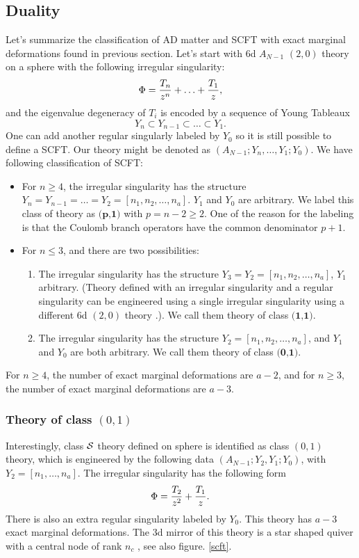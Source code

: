 \documentclass[a4paper,11pt]{article}
\begin{document}
\subsection{Duality}
Let's summarize the classification of AD matter and SCFT with exact marginal deformations found in previous section.  Let's start with 6d $A_{N-1}$ $(2,0)$ theory on a sphere with the following irregular singularity:
\begin{equation}
\Phi={T_n\over z^n}+\ldots+{T_1\over z},
\end{equation}
and the eigenvalue degeneracy of $T_i$ is encoded by a sequence of Young Tableaux
\begin{equation}
Y_{n}\subset Y_{n-1}\subset \ldots \subset Y_1.
\end{equation}
One can add another regular singularly labeled by  $Y_0$ so it is still possible to define a SCFT.  Our theory might be denoted as $(A_{N-1}; Y_{n},\ldots, Y_{1}; Y_0)$. 
We have following classification of SCFT:
\begin{itemize}
\item  For $n\geq 4$, the irregular singularity has the structure $Y_n=Y_{n-1}=\ldots=Y_2=[n_1, n_2,\ldots, n_a]$. $Y_1$ and $Y_0$ are arbitrary. We label this class of theory as $\textbf{(p,1)}$ with $p=n-2\geq 2$. One of the reason for the labeling
is that the Coulomb branch operators have the common denominator $p+1$.  
\item For $n\leq 3$,  and there are two possibilities:
\begin{enumerate}
\item The irregular singularity has the structure $Y_3=Y_2=[n_1, n_2, \ldots, n_a]$, $Y_1$ arbitrary.  (Theory defined with an irregular singularity and a regular singularity can be engineered using a single irregular singularity using a different 6d $(2,0)$ theory \cite{Xie:2012hs}.).
We call them theory of class $\textbf{(1,1)}$. 
\item The irregular singularity has the structure $Y_2=[n_1, n_2, \ldots, n_a]$, and $Y_1$ and $Y_0$ are both arbitrary. We call them theory of class $\textbf{(0,1)}$. 
\end{enumerate}
\end{itemize}
For $n\geq 4$, the number of exact marginal deformations are $a-2$, and for $n\geq 3$, the number of exact marginal deformations are $a-3$. 


\subsubsection{Theory of class $(0,1)$}
Interestingly, class ${\cal S}$ theory  defined on sphere is identified as class $(0,1)$ theory, which is engineered by the following data $(A_{N-1}; Y_2, Y_1; Y_0)$, with $Y_2=[n_1,\ldots, n_a]$.
The irregular singularity has the following form
\begin{equation}
\Phi={T_2\over z^2}+{T_1\over z}.
\end{equation}
There is also an extra regular singularity labeled by $Y_0$. This theory has $a-3$ exact marginal deformations. The 3d mirror of this theory is a star shaped quiver with 
a central node of rank $n_c$ \cite{Benini:2010uu}, see also figure. \ref{scft}.
\end{document}
